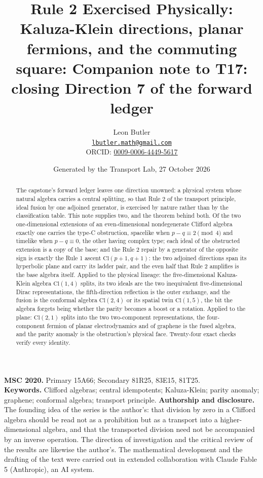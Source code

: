 \documentclass[11pt]{article}
\title{\bfseries Rule 2 Exercised Physically: Kaluza-Klein directions, planar fermions, and the commuting square: Companion note to T17: closing Direction 7 of the forward ledger}
\author{Leon Butler\\ \normalsize\href{mailto:lbutler.math@gmail.com}{\texttt{lbutler.math@gmail.com}}\\ \normalsize ORCID: \href{https://orcid.org/0009-0006-4449-5617}{0009-0006-4449-5617}}
\date{Generated by the Transport Lab, 27 October 2026}
\theoremstyle{definition}
\theoremstyle{plain}
\providecommand{\Cl}{}\renewcommand{\Cl}{\mathrm{Cl}}
\begin{document}
\maketitle
\begin{abstract}
\normalsize
The capstone's forward ledger leaves one direction unowned: a physical system whose natural algebra carries a central splitting, so that Rule 2 of the transport principle, ideal fusion by one adjoined generator, is exercised by nature rather than by the classification table. This note supplies two, and the theorem behind both. Of the two one-dimensional extensions of an even-dimensional nondegenerate Clifford algebra exactly one carries the type-C obstruction, spacelike when $p - q \equiv 2 \pmod 4$ and timelike when $p - q \equiv 0$, the other having complex type; each ideal of the obstructed extension is a copy of the base; and the Rule 2 repair by a generator of the opposite sign is exactly the Rule 1 ascent $\Cl(p{+}1,q{+}1)$: the two adjoined directions span its hyperbolic plane and carry its ladder pair, and the even half that Rule 2 amplifies is the base algebra itself. Applied to the physical lineage: the five-dimensional Kaluza-Klein algebra $\Cl(1,4)$ splits, its two ideals are the two inequivalent five-dimensional Dirac representations, the fifth-direction reflection is the outer exchange, and the fusion is the conformal algebra $\Cl(2,4)$ or its spatial twin $\Cl(1,5)$, the bit the algebra forgets being whether the parity becomes a boost or a rotation. Applied to the plane: $\Cl(2,1)$ splits into the two two-component representations, the four-component fermion of planar electrodynamics and of graphene is the fused algebra, and the parity anomaly is the obstruction's physical face. Twenty-four exact checks verify every identity.
\end{abstract}
\medskip
\noindent\textbf{MSC 2020.} Primary 15A66; Secondary 81R25, 83E15, 81T25.\\
\textbf{Keywords.} Clifford algebras; central idempotents; Kaluza-Klein; parity anomaly; graphene; conformal algebra; transport principle.
\newpage
\noindent \textbf{Authorship and disclosure. }The founding idea of the series is the author's: that division by zero in a Clifford algebra should be read not as a prohibition but as a transport into a higher-dimensional algebra, and that the transported division need not be accompanied by an inverse operation. The direction of investigation and the critical review of the results are likewise the author's. The mathematical development and the drafting of the text were carried out in extended collaboration with Claude Fable 5 (Anthropic), an AI system.
\end{document}
